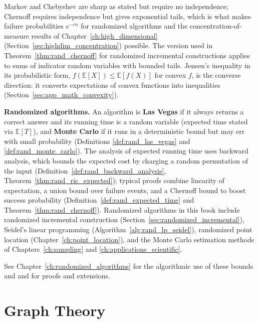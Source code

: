 Markov and Chebyshev are sharp as stated but require no independence;
Chernoff requires independence but gives exponential tails, which is what
makes failure probabilities $e^{-cn}$ for randomized algorithms and the
concentration-of-measure results of Chapter~\ref{ch:high_dimensional}
(Section~\ref{sec:highdim_concentration}) possible. The version used in
Theorem~\ref{thm:rand_chernoff} for randomized incremental constructions
applies to sums of indicator random variables with bounded tails. Jensen's
inequality in its probabilistic form,
$f(\mathbb{E}[X]) \le \mathbb{E}[f(X)]$ for convex $f$, is the converse
direction: it converts expectations of convex functions into inequalities
(Section~\ref{sec:app_math_convexity}).

\medskip
\noindent\textbf{Randomized algorithms.}
An algorithm is \textbf{Las Vegas} if it always returns a correct answer and
its running time is a random variable (expected time stated via
$\mathbb{E}[T]$), and \textbf{Monte Carlo} if it runs in a deterministic bound
but may err with small probability (Definitions \ref{def:rand_las_vegas} and
\ref{def:rand_monte_carlo}). The analysis of expected running time uses
backward analysis, which bounds the expected cost by charging a random
permutation of the input (Definition~\ref{def:rand_backward_analysis},
Theorem~\ref{thm:rand_ric_expected}); typical proofs combine linearity of
expectation, a union bound over failure events, and a Chernoff bound to boost
success probability (Definition~\ref{def:rand_expected_time} and
Theorem~\ref{thm:rand_chernoff}). Randomized algorithms in this book include
randomized incremental construction
(Section~\ref{sec:randomized_incremental}), Seidel's linear programming
(Algorithm~\ref{alg:rand_lp_seidel}), randomized point location
(Chapter~\ref{ch:point_location}), and the Monte Carlo estimation methods of
Chapters~\ref{ch:sampling} and \ref{ch:applications_scientific}.

See Chapter~\ref{ch:randomized_algorithms} for the algorithmic use of these
bounds and \cite{mitzenmacher2005} and \cite{ross2014} for proofs and
extensions.

\section{Graph Theory}
\label{sec:app_math_graphs}

